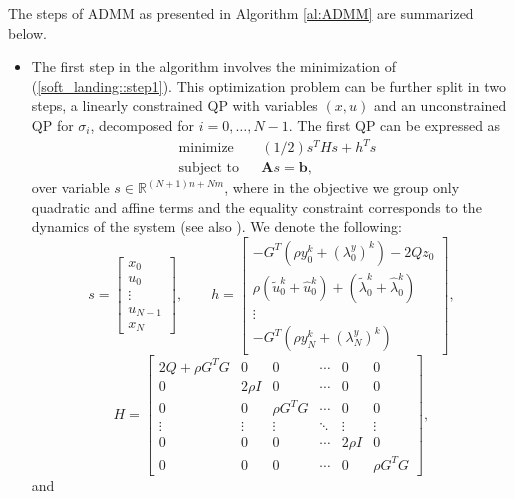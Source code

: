 \documentclass[openany]{now}
\newcommand{\reals}{{\mathbb R}}
\begin{document}
The steps of ADMM as presented in Algorithm \ref{al:ADMM} are summarized below.
\begin{itemize}
\item The first step in the algorithm involves the minimization of (\ref{soft_landing::step1}). This optimization problem can be further split in two steps, a linearly constrained QP with variables $(x,u)$ and an unconstrained QP for $\sigma_i$, decomposed for $i = 0,\ldots,N-1$.
The first QP can be expressed as
\begin{equation}\label{soft_landing::step1_KKT}
\begin{aligned}
 & \text{minimize} && (1/2)s^T H s + h^Ts  \\   
 & \text{subject to} && \boldsymbol{A} s = \boldsymbol{b},
\end{aligned}
\end{equation}
over variable $s \in \reals^{(N+1)n+Nm}$, where in the objective we group only quadratic and affine terms and the equality constraint corresponds to
the dynamics of the system (see also \cite{soc}). We denote the following:
\[
s = \left[\begin{array}{c} x_0\\u_0 \\\vdots\\u_{N-1}\\x_N \end{array} \right], \qquad
h = \left[\begin{array}{c} -G^T(\rho y_0^k + (\lambda_0^y)^k) - 2Qz_0\\ \rho(\tilde{u}_0^k+\hat{u}_0^k)+(\tilde{\lambda}_0^k+\hat{\lambda}_0^k) \\\vdots\\ -G^T(\rho y_N^k + (\lambda_N^y)^k)
  \end{array} \right],
\]
\[
H = \left[\begin{array}{cccccc}
2Q + \rho G^TG & 0 & 0 & \cdots & 0 & 0 \\
0 & 2\rho I & 0 & \cdots & 0 &0 \\
0 & 0 & \rho G^TG & \cdots & 0 &0 \\
\vdots & \vdots & \vdots & \ddots & \vdots & \vdots \\
0 & 0 & 0 & \cdots & 2\rho I & 0\\
0 & 0 & 0 & \cdots & 0 & \rho G^TG 
\end{array} \right],
\]
and


\end{itemize}
\end{document}
